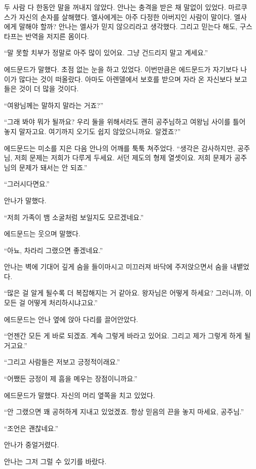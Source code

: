 두 사람 다 한동안 말을 꺼내지 않았다. 안나는 충격을 받은 채 말없이 있었다. 마르쿠스가 자신의 손자를 살해했다. 엘사에게는 아주 다정한 아버지인 사람이 말이다. 엘사에게 말해야 할까? 안나는 엘사가 믿지 않으리라고 생각했다. 그리고 믿는다 해도, 구스타프는 반역을 저지른 몸이다.

``말 못할 치부가 정말로 아주 많이 있어요. 그냥 건드리지 말고 계세요.''

에드문드가 말했다. 초점 없는 눈을 하고 있었다. 이번만큼은 에드문드가 자기보다 나이가 많다는 것이 떠올랐다. 아마도 아렌델에서 보호를 받으며 자라 온 자신보다 보고 들은 것이 더 많을 것이다.

``여왕님께는 말하지 말라는 거죠?''

``그래 봐야 뭐가 될까요? 우리 둘을 위해서라도 괜히 공주님하고 여왕님 사이를 틀어 놓지 말자고요. 여기까지 오기도 쉽지 않았으니까요. 알겠죠?''

에드문드는 미소를 지은 다음 안나의 어깨를 툭툭 쳐주었다. ``생각은 감사하지만, 공주님, 저희 문제는 저희가 다루게 두세요. 서던 제도의 형제 열셋이요. 저희 문제가 공주님의 문제가 돼서는 안 되죠.''

``그러시다면요.''

안나가 말했다.

``저희 가족이 뱀 소굴처럼 보일지도 모르겠네요.''

에드문드는 웃으며 말했다.

``아뇨, 차라리 그랬으면 좋겠네요.''

안나는 벽에 기대어 깊게 숨을 들이마시고 미끄러져 바닥에 주저앉으면서 숨을 내뱉었다.

``많은 걸 알게 될수록 더 복잡해지는 거 같아요. 왕자님은 어떻게 하세요? 그러니까, 이 모든 걸 어떻게 처리하시냐고요.''

에드문드는 안나 옆에 앉아 다리를 끌어안았다.

``언젠간 모든 게 바로 되겠죠. 계속 그렇게 바라고 있어요. 그리고 제가 그렇게 하게 될 거고요.''

``그리고 사람들은 저보고 긍정적이래요.''

``어쨌든 긍정이 제 흠을 메우는 장점이니까요.''

에드문드가 말했다. 자신의 머리 옆쪽을 치고 있었다.

``안 그랬으면 꽤 공허하게 지내고 있었겠죠. 항상 믿음의 끈을 놓지 마세요, 공주님.''

``조언은 괜찮네요.''

안나가 중얼거렸다.

안나는 그저 그럴 수 있기를 바랐다.



